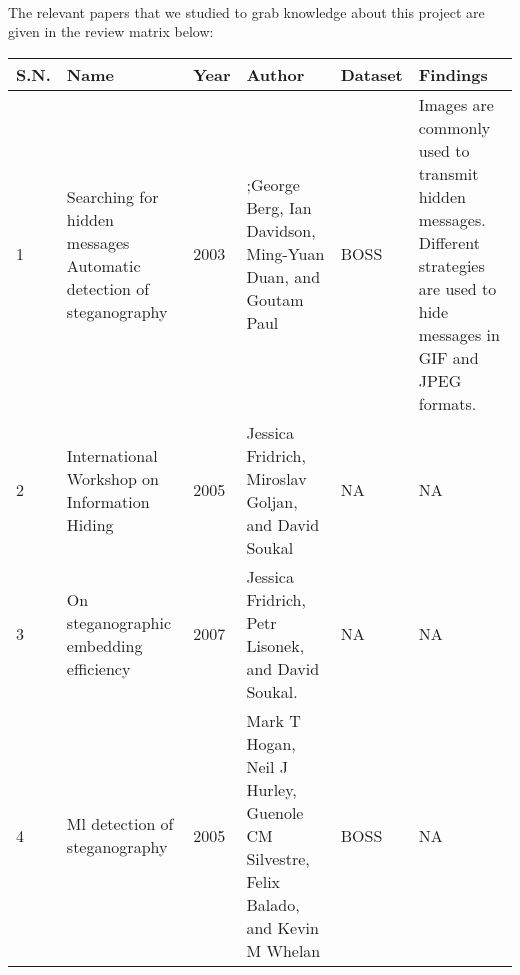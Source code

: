 \\The relevant papers that we studied to grab knowledge about this project are given in the review matrix below:
\begin{table}[!h]
        \begin{tabular}{|p{0.5cm}|p{3cm}|p{0.8cm}|p{2cm}|p{2cm}|p{4cm}|}
            \hline
        S.N. & Name                                                                            & Year & Author                                                                                 & Dataset          & Findings                                                                                                                                                                                          \\\hline
        1    & Searching for hidden messages Automatic detection of steganography              & 2003 & ;George Berg, Ian Davidson, Ming-Yuan Duan, and Goutam Paul                            & BOSS             & Images are commonly used to transmit hidden messages. Different strategies are used to hide messages in GIF and JPEG formats.                                                                     \\\hline
        2    & International Workshop on Information Hiding                                    & 2005 & Jessica Fridrich, Miroslav Goljan, and David Soukal                                    & NA               & NA                                                                                                                                                                                                \\\hline
        3    & On steganographic embedding efficiency                                          & 2007 & Jessica Fridrich, Petr Lisonek, and David Soukal.                                      & NA               & NA                                                                                                                                                                                                \\\hline
        4    & Ml detection of steganography                                                   & 2005 & Mark T Hogan, Neil J Hurley, Guenole CM Silvestre, Felix Balado, and Kevin M Whelan    & BOSS             & NA                                                                                                                                                                                                \\\hline

\end{tabular}
\end{table}
